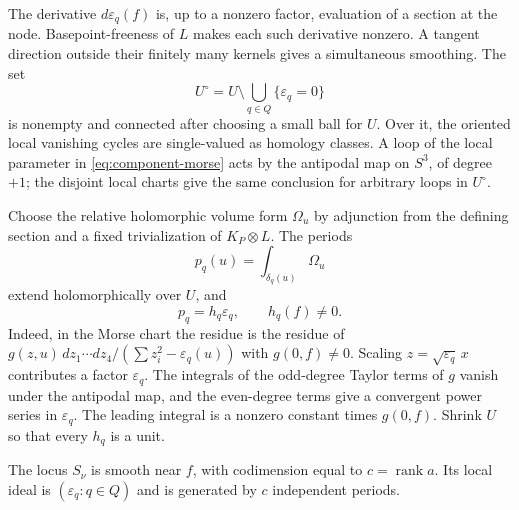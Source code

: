 The derivative $d\varepsilon_q(f)$ is, up to a nonzero factor,
evaluation of a section at the node. Basepoint-freeness of $L$ makes
each such derivative nonzero. A tangent direction outside their
finitely many kernels gives a simultaneous smoothing. The set
\[
 U^\circ=U\setminus\bigcup_{q\in Q}\{\varepsilon_q=0\}
\]
is nonempty and connected after choosing a small ball for $U$.
Over it, the oriented local vanishing cycles are single-valued as
homology classes. A loop of the local parameter in \eqref{eq:component-morse}
acts by the antipodal map on $S^3$, of degree $+1$; the disjoint local
charts give the same conclusion for arbitrary loops in $U^\circ$.

Choose the relative holomorphic volume form $\Omega_u$ by adjunction
from the defining section and a fixed trivialization of $K_P\otimes L$.
The periods
\[
 p_q(u)=\int_{\delta_q(u)}\Omega_u
\]
extend holomorphically over $U$, and
\begin{equation}\label{eq:component-periodunit}
 p_q=h_q\varepsilon_q,\qquad h_q(f)\ne0.
\end{equation}
Indeed, in the Morse chart the residue is the residue of
$g(z,u)\,dz_1\cdots dz_4/(\sum z_i^2-\varepsilon_q(u))$ with
$g(0,f)\ne0$. Scaling $z=\sqrt{\varepsilon_q}\,x$ contributes a factor
$\varepsilon_q$. The integrals of the odd-degree Taylor terms of $g$
vanish under the antipodal map, and the even-degree terms give a
convergent power series in $\varepsilon_q$. The leading integral is a
nonzero constant times $g(0,f)$. Shrink $U$ so that every $h_q$ is a unit.

\begin{lemma}\label{lem:component-smoothness}
The locus $S_\nu$ is smooth near $f$, with codimension equal to
$c=\operatorname{rank} a$. Its local ideal is $(\varepsilon_q:q\in Q)$ and is
generated by $c$ independent periods.
\end{lemma}

